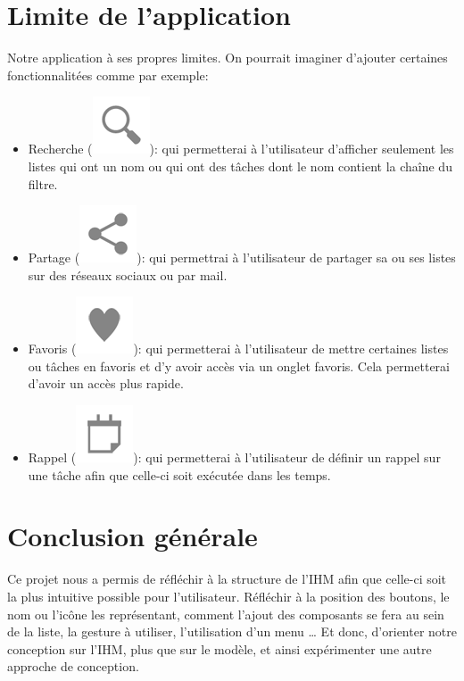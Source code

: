 \documentclass[a4paper,10pt]{article}
\begin{document}
\section{Limite de l'application}
Notre application à ses propres limites.
On pourrait imaginer d'ajouter certaines fonctionnalitées comme par exemple:
\begin{itemize}
\item Recherche (\includegraphics[scale=0.2]{Images/search.png}): qui permetterai à l'utilisateur d'afficher seulement les listes qui ont un nom ou qui ont des tâches dont le nom contient la chaîne du filtre.
\item Partage (\includegraphics[scale=0.2]{Images/share.png}): qui permettrai à l'utilisateur de partager sa ou ses listes sur des réseaux sociaux ou par mail.
\item Favoris (\includegraphics[scale=0.2]{Images/favorite.png}): qui permetterai à l'utilisateur de mettre certaines listes ou tâches en favoris et d'y avoir accès via un onglet favoris. Cela permetterai d'avoir un accès plus rapide.
\item Rappel (\includegraphics[scale=0.2]{Images/event.png}): qui permetterai à l'utilisateur de définir un rappel sur une tâche afin que celle-ci soit exécutée dans les temps.
\end{itemize}

\newpage
\section{Conclusion générale}
Ce projet nous a permis de réfléchir à la structure de l'IHM afin que celle-ci soit la plus intuitive possible pour l'utilisateur. Réfléchir à la position des
boutons, le nom ou l'icône les représentant, comment l'ajout des composants se fera au sein de la liste, la gesture à utiliser, l'utilisation d'un menu \ldots{}
Et donc, d'orienter notre conception sur l'IHM, plus que sur le modèle, et ainsi expérimenter une autre approche de conception.
\end{document}
